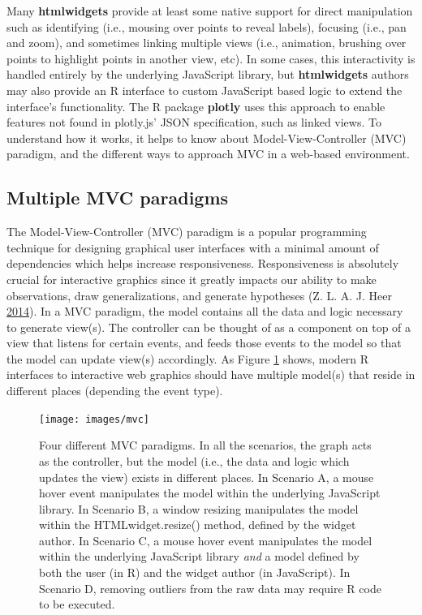 \documentclass[12pt,]{isuthesis}
\begin{document}
Many \textbf{htmlwidgets} provide at least some native support for
direct manipulation such as identifying (i.e., mousing over points to
reveal labels), focusing (i.e., pan and zoom), and sometimes linking
multiple views (i.e., animation, brushing over points to highlight
points in another view, etc). In some cases, this interactivity is
handled entirely by the underlying JavaScript library, but
\textbf{htmlwidgets} authors may also provide an R interface to custom
JavaScript based logic to extend the interface's functionality. The R
package \textbf{plotly} uses this approach to enable features not found
in plotly.js' JSON specification, such as linked views. To understand
how it works, it helps to know about Model-View-Controller (MVC)
paradigm, and the different ways to approach MVC in a web-based
environment.

\subsection{Multiple MVC paradigms}\label{multiple-mvc-paradigms}

The Model-View-Controller (MVC) paradigm is a popular programming
technique for designing graphical user interfaces with a minimal amount
of dependencies which helps increase responsiveness. Responsiveness is
absolutely crucial for interactive graphics since it greatly impacts our
ability to make observations, draw generalizations, and generate
hypotheses (Z. L. A. J. Heer
\protect\hyperlink{ref-2014-latency}{2014}). In a MVC paradigm, the
model contains all the data and logic necessary to generate view(s). The
controller can be thought of as a component on top of a view that
listens for certain events, and feeds those events to the model so that
the model can update view(s) accordingly. As Figure \ref{fig:mvc} shows,
modern R interfaces to interactive web graphics should have multiple
model(s) that reside in different places (depending the event type).

\begin{figure}
\centering
\texttt{[image: images/mvc]}
\caption{\label{fig:mvc}Four different MVC paradigms. In all the scenarios,
the graph acts as the controller, but the model (i.e., the data and
logic which updates the view) exists in different places. In Scenario A,
a mouse hover event manipulates the model within the underlying
JavaScript library. In Scenario B, a window resizing manipulates the
model within the HTMLwidget.resize() method, defined by the widget
author. In Scenario C, a mouse hover event manipulates the model within
the underlying JavaScript library \emph{and} a model defined by both the
user (in R) and the widget author (in JavaScript). In Scenario D,
removing outliers from the raw data may require R code to be executed.}
\end{figure}
\end{document}
